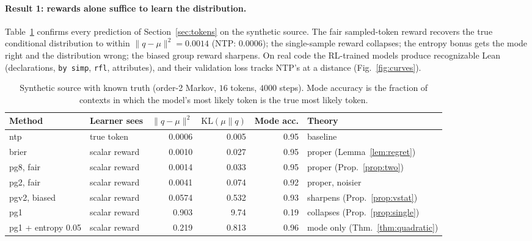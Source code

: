 \documentclass[11pt]{article}
\theoremstyle{definition}
\newcommand{\KL}{\mathrm{KL}}
\begin{document}
\paragraph{Result 1: rewards alone suffice to learn the distribution.} Table~\ref{tab:synth} confirms every prediction of Section~\ref{sec:tokens} on the synthetic source. The fair sampled-token reward recovers the true conditional distribution to within $\|q-\mu\|^2=0.0014$ (NTP: $0.0006$); the single-sample reward collapses; the entropy bonus gets the mode right and the distribution wrong; the biased group reward sharpens. On real code the RL-trained models produce recognizable Lean (declarations, \texttt{by simp}, \texttt{rfl}, attributes), and their validation loss tracks NTP's at a distance (Fig.~\ref{fig:curves}).

\begin{table}[t]
\centering
\caption{Synthetic source with known truth (order-2 Markov, $16$ tokens, $4000$ steps). Mode accuracy is the fraction of contexts in which the model's most likely token is the true most likely token.}\label{tab:synth}
\small
\begin{tabular}{llrrrl}
\toprule
Method & Learner sees & $\|q-\mu\|^2$ & $\KL(\mu\|q)$ & Mode acc. & Theory \\
\midrule
\textsf{ntp} & true token & 0.0006 & 0.005 & 0.95 & baseline \\
\textsf{brier} & scalar reward & 0.0010 & 0.027 & 0.95 & proper (Lemma~\ref{lem:regret}) \\
\textsf{pg8}, fair & scalar reward & 0.0014 & 0.033 & 0.95 & proper (Prop.~\ref{prop:two}) \\
\textsf{pg2}, fair & scalar reward & 0.0041 & 0.074 & 0.92 & proper, noisier \\
\textsf{pgv2}, biased & scalar reward & 0.0574 & 0.532 & 0.93 & sharpens (Prop.~\ref{prop:vstat}) \\
\textsf{pg1} & scalar reward & 0.903 & 9.74 & 0.19 & collapses (Prop.~\ref{prop:single}) \\
\textsf{pg1} + entropy 0.05 & scalar reward & 0.219 & 0.813 & 0.96 & mode only (Thm.~\ref{thm:quadratic}) \\
\bottomrule
\end{tabular}
\end{table}
\end{document}
